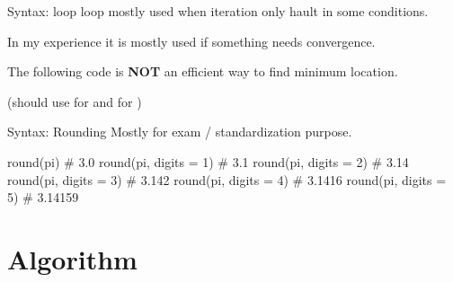 \documentclass[11pt,aspectratio=43,usenames,dvipsnames]{beamer}
\theoremstyle{definition}
\begin{document}
\begin{frame}[fragile]{Syntax:  loop}
\label{slide:Syntax___mintinline_julia__while__loop}
     loop mostly used when iteration only hault in some conditions.

    In my experience it is mostly used if something needs convergence.

    The following code is \textbf{NOT} an efficient way to find minimum location.

    (should use  for  and  for )


\end{frame}

\begin{frame}[fragile]{Syntax: Rounding}
\label{slide:Syntax__Rounding}
    Mostly for exam / standardization purpose.

    \begin{juliacode}
        round(pi)               # 3.0
        round(pi, digits = 1)   # 3.1
        round(pi, digits = 2)   # 3.14
        round(pi, digits = 3)   # 3.142
        round(pi, digits = 4)   # 3.1416
        round(pi, digits = 5)   # 3.14159
    \end{juliacode}
\end{frame}

\section{Algorithm}
\label{sec:Algorithm}
\end{document}
